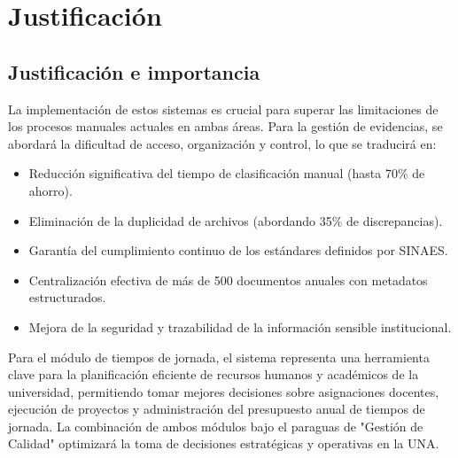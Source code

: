 \chapter{Justificación}
\section{Justificación e importancia}
La implementación de estos sistemas es crucial para superar las limitaciones de los procesos manuales actuales en ambas áreas. Para la gestión de evidencias, se abordará la dificultad de acceso, organización y control, lo que se traducirá en:
\begin{itemize}
    \item Reducción significativa del tiempo de clasificación manual (hasta 70\% de ahorro).
    \item Eliminación de la duplicidad de archivos (abordando 35\% de discrepancias).
    \item Garantía del cumplimiento continuo de los estándares definidos por SINAES.
    \item Centralización efectiva de más de 500 documentos anuales con metadatos estructurados.
    \item Mejora de la seguridad y trazabilidad de la información sensible institucional.
\end{itemize}
Para el módulo de tiempos de jornada, el sistema representa una herramienta clave para la planificación eficiente de recursos humanos y académicos de la universidad, permitiendo tomar mejores decisiones sobre asignaciones docentes, ejecución de proyectos y administración del presupuesto anual de tiempos de jornada. La combinación de ambos módulos bajo el paraguas de "Gestión de Calidad" optimizará la toma de decisiones estratégicas y operativas en la UNA.
